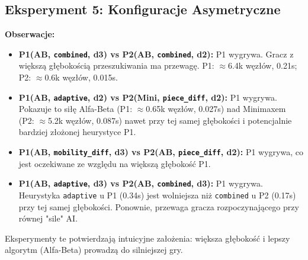 \documentclass[12pt,a4paper]{article}
\newcommand{\code}[1]{\texttt{#1}} %
\begin{document}
\subsection{Eksperyment 5: Konfiguracje Asymetryczne}
\textbf{Obserwacje:}
\begin{itemize}
    \item \textbf{P1(AB, \code{combined}, d3) vs P2(AB, \code{combined}, d2):} P1 wygrywa. Gracz z większą głębokością przeszukiwania ma przewagę. P1: $\approx$6.4k węzłów, 0.21s; P2: $\approx$0.6k węzłów, 0.015s.
    \item \textbf{P1(AB, \code{adaptive}, d2) vs P2(Mini, \code{piece\_diff}, d2):} P1 wygrywa. Pokazuje to siłę Alfa-Beta (P1: $\approx$0.65k węzłów, 0.027s) nad Minimaxem (P2: $\approx$5.2k węzłów, 0.087s) nawet przy tej samej głębokości i potencjalnie bardziej złożonej heurystyce P1.
    \item \textbf{P1(AB, \code{mobility\_diff}, d3) vs P2(AB, \code{piece\_diff}, d2):} P1 wygrywa, co jest oczekiwane ze względu na większą głębokość P1.
    \item \textbf{P1(AB, \code{adaptive}, d3) vs P2(AB, \code{combined}, d3):} P1 wygrywa. Heurystyka \code{adaptive} u P1 (0.34s) jest wolniejsza niż \code{combined} u P2 (0.17s) przy tej samej głębokości. Ponownie, przewaga gracza rozpoczynającego przy równej "sile" AI.
\end{itemize}
Eksperymenty te potwierdzają intuicyjne założenia: większa głębokość i lepszy algorytm (Alfa-Beta) prowadzą do silniejszej gry.
\end{document}

